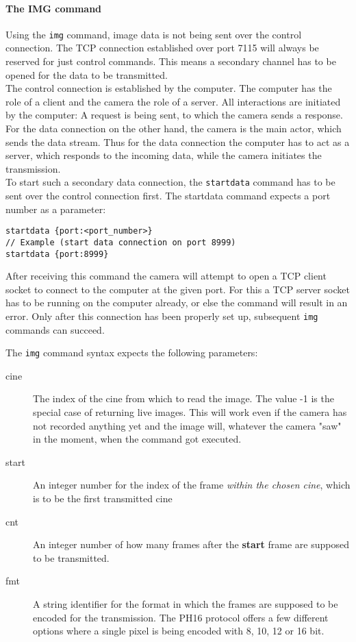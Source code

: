 \paragraph{The IMG command}
Using the \texttt{img} command, image data is not being sent over the control connection. The TCP connection established over port 7115 will always be reserved for just control commands. This means a secondary channel has to be opened for the data to be transmitted.\\
The control connection is established by the computer. The computer has the role of a client and the camera the role of a server. All interactions are initiated by the computer: A request is being sent, to which the camera sends a response. For the data connection on the other hand, the camera is the main actor, which sends the data stream. Thus for the data connection the computer has to act as a server, which responds to the incoming data, while the camera initiates the transmission.\\
To start such a secondary data connection, the \texttt{startdata} command has to be sent over the control connection first. The startdata command expects a port number as a parameter:
\begin{lstlisting}
startdata {port:<port_number>}
// Example (start data connection on port 8999)
startdata {port:8999}
\end{lstlisting}
After receiving this command the camera will attempt to open a TCP client socket to connect to the computer at the given port. For this a TCP server socket has to be running on the computer already, or else the command will result in an error. Only after this connection has been properly set up, subsequent \texttt{img} commands can succeed.\par
The \texttt{img} command syntax expects the following parameters:
\begin{description}
\item[cine] The index of the cine from which to read the image. The value -1 is the special case of returning live images. This will work even if the camera has not recorded anything yet and the image will, whatever the camera "saw" in the moment, when the command got executed.
\item[start] An integer number for the index of the frame \textit{within the chosen cine}, which is to be the first transmitted cine
\item[cnt] An integer number of how many frames after the \textbf{start} frame are supposed to be transmitted.
\item[fmt] A string identifier for the format in which the frames are supposed to be encoded for the transmission. The PH16 protocol offers a few different options where a single pixel is being encoded with 8, 10, 12 or 16 bit.  
\end{description}
